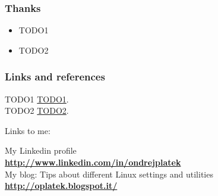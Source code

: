 \begin{frame}\frametitle{Thanks} 
\begin{itemize}
    \item TODO1 
    \item TODO2 
\end{itemize}

\end{frame}

\begin{frame}\frametitle{Links and references} 
\begin{center}
TODO1 \url{TODO1}.\\
TODO2 \url{TODO2}.
\end{center}

\begin{alertblock}{Links to me:}
\begin{center}
My Linkedin profile\\
{\bf \url{http://www.linkedin.com/in/ondrejplatek}}\\
My blog: Tips about different Linux settings and utilities\\
{\bf \url{http://oplatek.blogspot.it/}}\\
\end{center}
\end{alertblock}
\end{frame}

